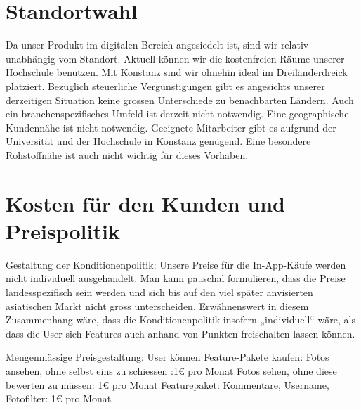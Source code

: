\section{Standortwahl}
Da unser Produkt im digitalen Bereich angesiedelt ist, sind wir relativ unabhängig vom Standort. Aktuell können wir die kostenfreien Räume unserer Hochschule benutzen. Mit Konstanz sind wir ohnehin ideal im Dreiländerdreick platziert. Bezüglich steuerliche Vergünstigungen gibt es angesichts unserer derzeitigen Situation keine grossen Unterschiede zu benachbarten Ländern. Auch ein branchenspezifisches Umfeld ist derzeit nicht notwendig. Eine geographische Kundennähe ist nicht notwendig. Geeignete Mitarbeiter gibt es aufgrund der Universität und der Hochschule in Konstanz genügend. Eine besondere Rohstoffnähe ist auch nicht wichtig für dieses Vorhaben.



\section{Kosten für den Kunden und Preispolitik}
Gestaltung der Konditionenpolitik: Unsere Preise für die In-App-Käufe werden nicht individuell ausgehandelt. Man kann pauschal formulieren, dass die Preise landesspezifisch sein werden und sich bis auf den viel später anvisierten asiatischen Markt nicht gross unterscheiden.
Erwähnenswert in diesem Zusammenhang wäre, dass die Konditionenpolitik insofern „individuell“ wäre, als dass die User sich Features auch anhand von Punkten freischalten lassen können.

Mengenmässige Preisgestaltung: User können Feature-Pakete kaufen: 
Fotos ansehen, ohne selbst eins zu schiessen :1€ pro Monat
Fotos sehen, ohne diese bewerten zu müssen: 1€ pro Monat
Featurepaket: Kommentare, Username, Fotofilter: 1€ pro Monat



